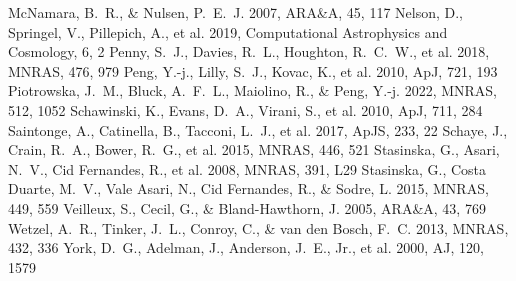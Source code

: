 \documentclass[twocolumn]{aastex631}
\begin{document}
\begin{thebibliography}{}
 McNamara, B.~R., \& Nulsen, P.~E.~J. 2007, ARA\&A, 45, 117
 Nelson, D., Springel, V., Pillepich, A., et al. 2019, Computational Astrophysics and Cosmology, 6, 2
 Penny, S.~J., Davies, R.~L., Houghton, R.~C.~W., et al. 2018, MNRAS, 476, 979
 Peng, Y.-j., Lilly, S.~J., Kovac, K., et al. 2010, ApJ, 721, 193
 Piotrowska, J.~M., Bluck, A.~F.~L., Maiolino, R., \& Peng, Y.-j. 2022, MNRAS, 512, 1052
 Schawinski, K., Evans, D.~A., Virani, S., et al. 2010, ApJ, 711, 284
 Saintonge, A., Catinella, B., Tacconi, L.~J., et al. 2017, ApJS, 233, 22
 Schaye, J., Crain, R.~A., Bower, R.~G., et al. 2015, MNRAS, 446, 521
 Stasinska, G., Asari, N.~V., Cid Fernandes, R., et al. 2008, MNRAS, 391, L29
 Stasinska, G., Costa Duarte, M.~V., Vale Asari, N., Cid Fernandes, R., \& Sodre, L. 2015, MNRAS, 449, 559
 Veilleux, S., Cecil, G., \& Bland-Hawthorn, J. 2005, ARA\&A, 43, 769
 Wetzel, A.~R., Tinker, J.~L., Conroy, C., \& van den Bosch, F.~C. 2013, MNRAS, 432, 336
 York, D.~G., Adelman, J., Anderson, J.~E., Jr., et al. 2000, AJ, 120, 1579
\end{thebibliography}
\end{document}
